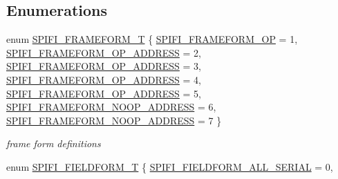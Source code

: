 \subsection*{Enumerations}
\begin{DoxyCompactItemize}
\item 
enum \hyperlink{group___l_p_c_s_p_i_f_i_l_i_b___h_w___p_r_i_m_ga83a0cb36aa268d35220e3d3e25453bd8}{S\+P\+I\+F\+I\+\_\+\+F\+R\+A\+M\+E\+F\+O\+R\+M\+\_\+T} \{ \newline
\hyperlink{group___l_p_c_s_p_i_f_i_l_i_b___h_w___p_r_i_m_gga83a0cb36aa268d35220e3d3e25453bd8a7ab8d7bdd5049867baaa844a849d5064}{S\+P\+I\+F\+I\+\_\+\+F\+R\+A\+M\+E\+F\+O\+R\+M\+\_\+\+OP} = 1, 
\hyperlink{group___l_p_c_s_p_i_f_i_l_i_b___h_w___p_r_i_m_gga83a0cb36aa268d35220e3d3e25453bd8a8b5ae3e8e4b6d054f6209e3ae9f60240}{S\+P\+I\+F\+I\+\_\+\+F\+R\+A\+M\+E\+F\+O\+R\+M\+\_\+\+O\+P\+\_\+A\+D\+D\+R\+E\+SS} = 2, 
\hyperlink{group___l_p_c_s_p_i_f_i_l_i_b___h_w___p_r_i_m_gga83a0cb36aa268d35220e3d3e25453bd8ac2ef53b5e3e5b22924a84a692cfb1d34}{S\+P\+I\+F\+I\+\_\+\+F\+R\+A\+M\+E\+F\+O\+R\+M\+\_\+\+O\+P\+\_\+A\+D\+D\+R\+E\+SS} = 3, 
\hyperlink{group___l_p_c_s_p_i_f_i_l_i_b___h_w___p_r_i_m_gga83a0cb36aa268d35220e3d3e25453bd8acbe7cef5c879c104868e87e1ba02e48b}{S\+P\+I\+F\+I\+\_\+\+F\+R\+A\+M\+E\+F\+O\+R\+M\+\_\+\+O\+P\+\_\+A\+D\+D\+R\+E\+SS} = 4, 
\newline
\hyperlink{group___l_p_c_s_p_i_f_i_l_i_b___h_w___p_r_i_m_gga83a0cb36aa268d35220e3d3e25453bd8a6e7d0e18073d1831d0689d1f1da914a8}{S\+P\+I\+F\+I\+\_\+\+F\+R\+A\+M\+E\+F\+O\+R\+M\+\_\+\+O\+P\+\_\+A\+D\+D\+R\+E\+SS} = 5, 
\hyperlink{group___l_p_c_s_p_i_f_i_l_i_b___h_w___p_r_i_m_gga83a0cb36aa268d35220e3d3e25453bd8abf603149dbd5f454517389b8a4a25572}{S\+P\+I\+F\+I\+\_\+\+F\+R\+A\+M\+E\+F\+O\+R\+M\+\_\+\+N\+O\+O\+P\+\_\+A\+D\+D\+R\+E\+SS} = 6, 
\hyperlink{group___l_p_c_s_p_i_f_i_l_i_b___h_w___p_r_i_m_gga83a0cb36aa268d35220e3d3e25453bd8acd367818a9c5d4c534e8e853f9ebde99}{S\+P\+I\+F\+I\+\_\+\+F\+R\+A\+M\+E\+F\+O\+R\+M\+\_\+\+N\+O\+O\+P\+\_\+A\+D\+D\+R\+E\+SS} = 7
 \}\begin{DoxyCompactList}\small\item\em frame form definitions \end{DoxyCompactList}
\item 
enum \hyperlink{group___l_p_c_s_p_i_f_i_l_i_b___h_w___p_r_i_m_gae4177c2639b4aa20ccdc833c2ef42123}{S\+P\+I\+F\+I\+\_\+\+F\+I\+E\+L\+D\+F\+O\+R\+M\+\_\+T} \{ \hyperlink{group___l_p_c_s_p_i_f_i_l_i_b___h_w___p_r_i_m_ggae4177c2639b4aa20ccdc833c2ef42123a0f1c08fd008999a26a107832f197056b}{S\+P\+I\+F\+I\+\_\+\+F\+I\+E\+L\+D\+F\+O\+R\+M\+\_\+\+A\+L\+L\+\_\+\+S\+E\+R\+I\+AL} = 0, 

\end{DoxyCompactItemize}
